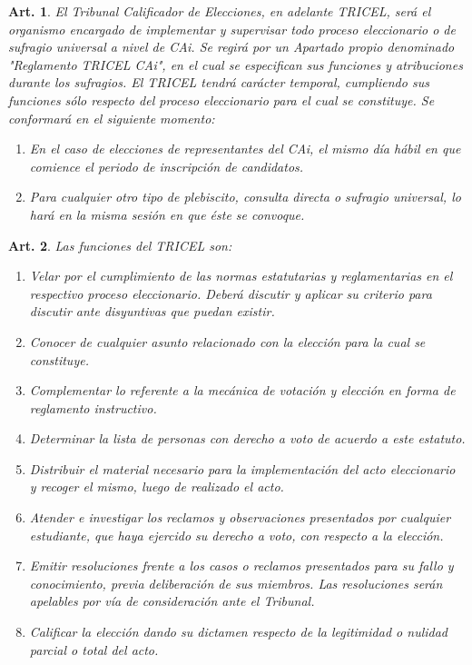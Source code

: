 \documentclass[letterpaper,11pt]{article}
\theoremstyle{plain}
\newtheorem{art}{Art.} %
\begin{document}
			\begin{art}\label{definicionTRICEL}
				El Tribunal Calificador de Elecciones, en adelante TRICEL, será el organismo encargado de implementar y supervisar todo proceso eleccionario o de sufragio universal a nivel de CAi. Se regirá por un Apartado propio denominado "Reglamento TRICEL CAi", en el cual se especifican sus funciones y atribuciones durante los sufragios. El TRICEL tendrá carácter temporal, cumpliendo sus funciones sólo respecto del proceso eleccionario para el cual se constituye. Se conformará en el siguiente momento:
				\begin{enumerate}
					\item En el caso de elecciones de representantes del CAi, el mismo día hábil en que comience el periodo de inscripción de candidatos.
					\item Para cualquier otro tipo de plebiscito, consulta directa o sufragio universal, lo hará en la misma sesión en que éste se convoque.
				\end{enumerate}
			\end{art}

			\begin{art}\label{funcionesTRICEL}
				Las funciones del TRICEL son:
				\begin{enumerate}
					\item Velar por el cumplimiento de las normas estatutarias y reglamentarias en el respectivo proceso eleccionario. Deberá discutir y aplicar su criterio para discutir ante disyuntivas que puedan existir.
					\item Conocer de cualquier asunto relacionado con la elección para la cual se constituye.
					\item Complementar lo referente a la mecánica de votación y elección en forma de reglamento instructivo.
					\item Determinar la lista de personas con derecho a voto de acuerdo a este estatuto.
					\item Distribuir el material necesario para la implementación del acto eleccionario y recoger el mismo, luego de realizado el acto.
					\item Atender e investigar los reclamos y observaciones presentados por cualquier estudiante, que haya ejercido su derecho a voto, con respecto a la elección.
					\item Emitir resoluciones frente a los casos o reclamos presentados para su fallo y conocimiento, previa deliberación de sus miembros. Las resoluciones serán apelables por vía de consideración ante el Tribunal.
					\item Calificar la elección dando su dictamen respecto de la legitimidad o nulidad parcial o total del acto.
				\end{enumerate}
			\end{art}
\end{document}
